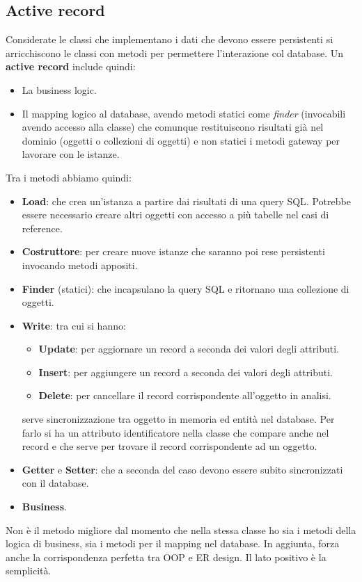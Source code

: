 \subsection{Active record}
Considerate le classi che implementano i dati che devono essere persistenti si
arricchiscono le classi con metodi per permettere l'interazione col database. Un
\textbf{active record} include quindi:
\begin{itemize}
      \item La business logic.
      \item Il mapping logico al database, avendo  metodi statici come \textit{finder}
            (invocabili avendo accesso alla classe) che comunque restituiscono
            risultati già nel dominio (oggetti o collezioni di oggetti) e non
            statici i metodi gateway per lavorare con le istanze.
\end{itemize}
Tra i metodi abbiamo quindi:
\begin{itemize}
      \item \textbf{Load}: che crea un'istanza a partire dai risultati di una query
            SQL. Potrebbe essere necessario creare altri oggetti con accesso a
            più tabelle nel casi di reference.
      \item \textbf{Costruttore}: per creare nuove istanze che saranno poi rese
            persistenti invocando metodi appositi.
      \item \textbf{Finder} (statici): che incapsulano la query SQL e ritornano
            una collezione di oggetti.
      \item \textbf{Write}: tra cui si hanno:
            \begin{itemize}
                  \item \textbf{Update}: per aggiornare un record a seconda dei
                        valori degli attributi.
                  \item \textbf{Insert}: per aggiungere un record a seconda dei
                        valori degli attributi.
                  \item \textbf{Delete}: per cancellare il record corrispondente
                        all'oggetto in analisi.
            \end{itemize}
            serve sincronizzazione tra oggetto in memoria ed entità nel database.
            Per farlo si ha un attributo identificatore nella classe che compare
            anche nel record e che serve per trovare il record corrispondente ad
            un oggetto.
      \item \textbf{Getter} e \textbf{Setter}: che a seconda del caso devono essere
            subito sincronizzati con il database.
      \item \textbf{Business}.
\end{itemize}
Non è il metodo migliore dal momento che nella stessa classe ho sia i metodi
della logica di business, sia i metodi per il mapping nel database. In aggiunta,
forza anche la corrispondenza perfetta tra OOP e ER design. Il lato positivo è la
semplicità.
